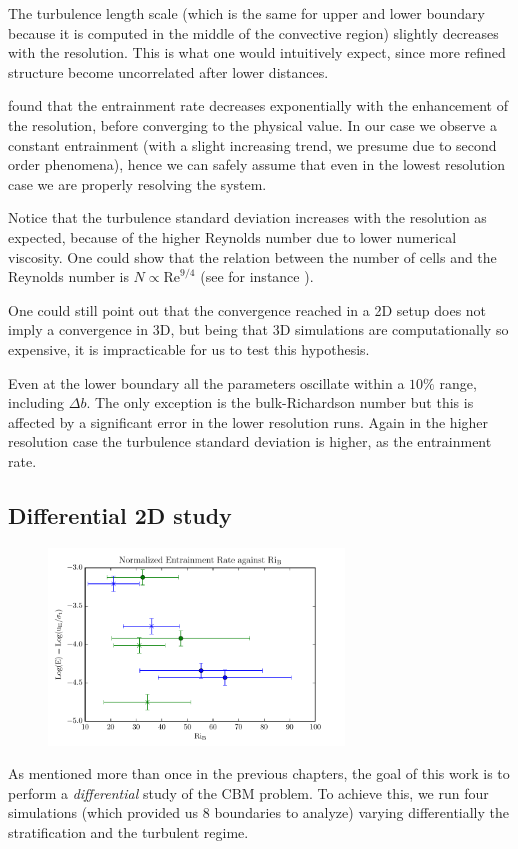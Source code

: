 The turbulence length scale (which is the same for upper and lower boundary because it is computed in the middle of the convective region) slightly decreases with the resolution. This is what one would intuitively expect, since more refined structure become uncorrelated after lower distances.

\cite{woodward} found that the entrainment rate decreases exponentially with the enhancement of the resolution, before converging to the physical value. In our case we observe a constant entrainment (with a slight increasing trend, we presume due to second order phenomena), hence we can safely assume that even in the lowest resolution case we are properly resolving the system. 

Notice that the turbulence standard deviation increases with the resolution as expected, because of the higher Reynolds number due to lower numerical viscosity. One could show that the relation between the number of cells and the Reynolds number is $N \propto \mathrm{Re}^{9/4}$ (see for instance \citet{coleman}). 

One could still point out that the convergence reached in a 2D setup does not imply a convergence in 3D, but being that 3D simulations are computationally so expensive, it is impracticable for us to test this hypothesis.

Even at the lower boundary all the parameters oscillate within a $10 \%$ range, including $\Delta b$. The only exception is the bulk-Richardson number but this is affected by a significant error in the lower resolution runs. Again in the higher resolution case the turbulence standard deviation is higher, as the entrainment rate.



\subsection{Differential 2D study}

\begin{figure}[t!]
\centering
\includegraphics[width=0.7\textwidth]{./img/differential2d.pdf}
\caption{}
\label{fig:differential}
\centering
\end{figure}
As mentioned more than once in the previous chapters, the goal of this work is to perform a \textit{differential} study of the CBM problem. To achieve this, we run four simulations (which provided us 8 boundaries to analyze) varying differentially the stratification and the turbulent regime. 

